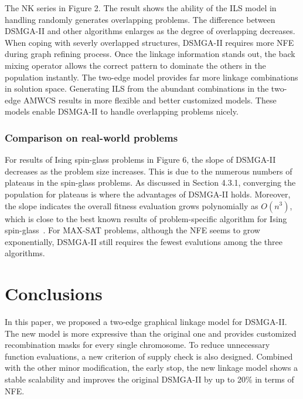 \documentclass{sig-alternate-05-2015}
\begin{document}
The NK series in Figure 2.
The result shows the ability of the ILS model in handling randomly generates overlapping problems. 
The difference between DSMGA-II and other algorithms enlarges as the degree of overlapping decreases. 
When coping with severly overlapped structures, DSMGA-II requires more NFE during graph refining process.
Once the linkage information stands out, the back mixing operator allows the correct pattern to dominate the others in the population instantly. 
The two-edge model provides far more linkage combinations in solution space.
Generating ILS from the abundant combinations in the two-edge AMWCS results in more flexible and better customized models.
These models enable DSMGA-II to handle overlapping problems nicely. 


\subsubsection{ Comparison on real-world problems }



For results of Ising spin-glass problems in Figure 6, the slope of DSMGA-II decreases as the problem size increases. 
This is due to the numerous numbers of plateaus in the spin-glass problems.
As discussed in Section 4.3.1, converging the population for plateaus is where the advantages of DSMGA-II holds.
Moreover, the slope indicates the overall fitness evaluation grows polynomially as $O(n^3)$, which is close to the best known results of problem-specific algorithm for Ising spin-glass~\cite{galluccio:pfaffian}.
For MAX-SAT problems, although the NFE seems to grow exponentially, DSMGA-II still requires the fewest evalutions among the three algorithms.



\section{Conclusions}
 
In this paper, we proposed a two-edge graphical linkage model for DSMGA-II. 
The new model is more expressive than the original one and provides customized recombination masks for every single chromosome. 
To reduce unnecessary function evaluations, a new criterion of supply check  is also designed. Combined with the other minor modification, the early stop, the new linkage model shows a stable scalability and improves the original DSMGA-II by up to 20\% in terms of NFE.
\end{document}
